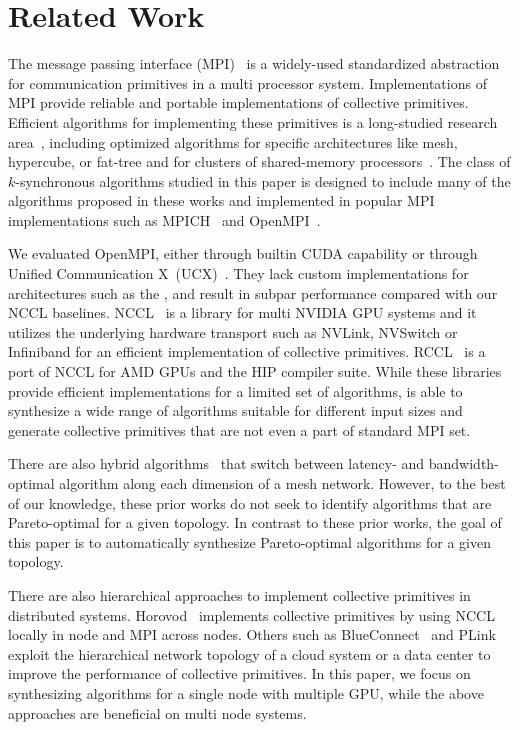 
\section{Related Work}
The message passing interface (MPI)~\cite{dongarra2013mpi} is a
widely-used standardized abstraction for communication primitives in a
multi processor system. Implementations of MPI provide reliable and
portable implementations of collective primitives. Efficient
algorithms for implementing these primitives is a long-studied
research area~\cite{pjevsivac2007performance, chan2007collective,
thakur2005optimization}, including optimized algorithms for specific
architectures like mesh, hypercube, or
fat-tree\cite{scott1991efficient,bokhari1992complete,barnett1993global}
and for clusters of shared-memory
processors~\cite{sistare1999optimization,traff2002improved,sanders2002hierarchical,tipparaju2003fast}.
The class of $k$-synchronous algorithms studied in this paper is
designed to include many of the algorithms proposed in these works and
implemented in popular MPI implementations such as
MPICH~\cite{thakur2005optimization} and
OpenMPI~\cite{gabriel2004open}.

We evaluated OpenMPI, either through builtin CUDA capability or
through Unified Communication X~(UCX)~\cite{ucx}. They lack custom
implementations for architectures such as the \dgxone{}, and result in
subpar performance compared with our NCCL baselines. NCCL~\cite{nccl}
is a library for multi NVIDIA GPU systems and it utilizes the
underlying hardware transport such as NVLink, NVSwitch or Infiniband
for an efficient implementation of collective primitives.
RCCL~\cite{rccl} is a port of NCCL for AMD GPUs and the HIP compiler
suite. While these libraries provide efficient implementations for a
limited set of algorithms, \tool{} is able to synthesize a wide range
of algorithms suitable for different input sizes and generate
collective primitives that are not even a part of standard MPI set.

There are also hybrid algorithms~\cite{barnett1994building,
chan2007collective} that switch between latency- and bandwidth-optimal
algorithm along each dimension of a mesh network. However, to the best
of our knowledge, these prior works do not seek to identify algorithms
that are Pareto-optimal for a given topology. In contrast to these
prior works, the goal of this paper is to automatically synthesize
Pareto-optimal algorithms for a given topology.

There are also hierarchical approaches to implement collective
primitives in distributed systems. Horovod~\cite{alex2018horovod}
implements collective primitives by using NCCL locally in node and MPI
across nodes. Others such as BlueConnect~\cite{blueconnect} and
PLink~\cite{plink} exploit the hierarchical network topology of a
cloud system or a data center to improve the performance of collective
primitives. In this paper, we focus on synthesizing algorithms for a
single node with multiple GPU, while the above approaches are
beneficial on multi node systems.

